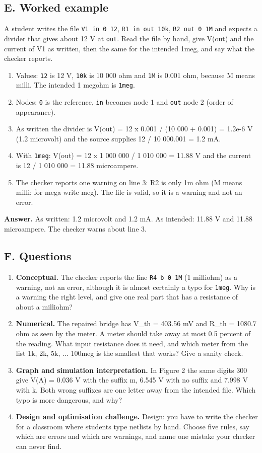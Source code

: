 \documentclass[11pt,a4paper]{article}
\begin{document}
\subsection*{E. Worked example}
A student writes the file \texttt{V1 in 0 12}, \texttt{R1 in out 10k}, \texttt{R2 out 0 1M} and expects a divider that gives about 12 V at \texttt{out}. Read the file by hand, give V(out) and the current of V1 as written, then the same for the intended 1meg, and say what the checker reports.
\begin{enumerate}[nosep]
\item Values: \texttt{12} is 12 V, \texttt{10k} is 10 000 ohm and \texttt{1M} is 0.001 ohm, because M means milli. The intended 1 megohm is \texttt{1meg}.
\item Nodes: \texttt{0} is the reference, \texttt{in} becomes node 1 and \texttt{out} node 2 (order of appearance).
\item As written the divider is V(out) = 12 x 0.001 / (10 000 + 0.001) = 1.2e-6 V (1.2 microvolt) and the source supplies 12 / 10 000.001 = 1.2 mA.
\item With \texttt{1meg}: V(out) = 12 x 1 000 000 / 1 010 000 = 11.88 V and the current is 12 / 1 010 000 = 11.88 microampere.
\item The checker reports one warning on line 3: R2 is only 1m ohm (M means milli; for mega write meg). The file is valid, so it is a warning and not an error.
\end{enumerate}
\textbf{Answer.} As written: 1.2 microvolt and 1.2 mA. As intended: 11.88 V and 11.88 microampere. The checker warns about line 3.

\subsection*{F. Questions}
\begin{enumerate}[nosep]
\item \textbf{Conceptual.} The checker reports the line \texttt{R4 b 0 1M} (1 milliohm) as a warning, not an error, although it is almost certainly a typo for \texttt{1meg}. Why is a warning the right level, and give one real part that has a resistance of about a milliohm?
\item \textbf{Numerical.} The repaired bridge has V\_th = 403.56 mV and R\_th = 1080.7 ohm as seen by the meter. A meter should take away at most 0.5 percent of the reading. What input resistance does it need, and which meter from the list 1k, 2k, 5k, ... 100meg is the smallest that works? Give a sanity check.
\item \textbf{Graph and simulation interpretation.} In Figure 2 the same digits 300 give V(A) = 0.036 V with the suffix m, 6.545 V with no suffix and 7.998 V with k. Both wrong suffixes are one letter away from the intended file. Which typo is more dangerous, and why?
\item \textbf{Design and optimisation challenge.} Design: you have to write the checker for a classroom where students type netlists by hand. Choose five rules, say which are errors and which are warnings, and name one mistake your checker can never find.
\end{enumerate}
\end{document}
